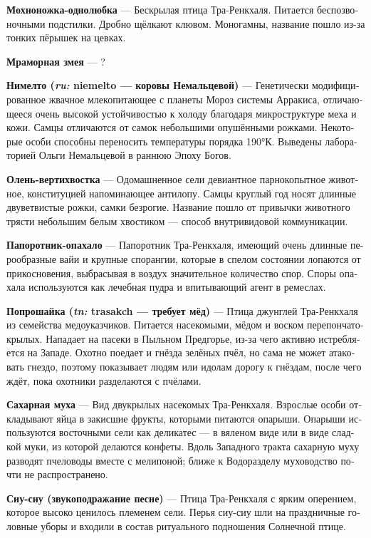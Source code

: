 \documentclass[a4paper,12pt,fleqn]{book}\usepackage{polyglossia}\setdefaultlanguage[babelshorthands=true]{russian}\setotherlanguage{english}\defaultfontfeatures{Ligatures=TeX,Mapping=tex-text}\usepackage{xcolor}\newcommand{\ml}[3]{#2}
\newcommand{\theterm}[3]{\textbf{\hypertarget{#1}{#2}} --- #3}
\newcommand{\theorigin}[3]{\textit{#1:} #2 --- #3}
\begin{document}
\theterm{one-love-furfeet}
{Мохноножка-однолюбка}
{Бескрылая птица Тра-Ренкхаля.
Питается беспозвоночными подстилки.
Дробно щёлкают клювом.
Моногамны, название пошло из-за тонких пёрышек на цевках.}

\theterm{marblesnake}
{Мраморная змея}
{?}

\theterm{niemelto}
{Нимелто (\theorigin{ru}{niemelto}{коровы Немальцевой})}
{Генетически модифицированное жвачное млекопитающее с планеты Мороз системы Арракиса, отличающееся очень высокой устойчивостью к холоду благодаря микроструктуре меха и кожи.
Самцы отличаются от самок небольшими опушёнными рожками. Некоторые особи способны переносить температуры порядка 190°К.
Выведены лабораторией Ольги Немальцевой в раннюю Эпоху Богов.}

\theterm{fiddletail-deer}
{Олень-вертихвостка}
{Одомашненное сели девиантное парнокопытное животное, конституцией напоминающее антилопу.
Самцы круглый год носят длинные двуветвистые рожки, самки безрогие.
Название пошло от привычки животного трясти небольшим белым хвостиком --- способ внутривидовой коммуникации.}

\theterm{swing-around}
{Папоротник-опахало}
{Папоротник Тра-Ренкхаля, имеющий очень длинные перообразные вайи и крупные спорангии, которые в спелом состоянии лопаются от прикосновения, выбрасывая в воздух значительное количество спор.
Споры опахала используются как лечебная пудра и впитывающий агент в ремеслах.}

\theterm{beggarbird}
{Попрошайка (\theorigin{tn}{trasakch}{требует мёд})}
{Птица джунглей Тра-Ренкхаля из семейства медоуказчиков.
Питается насекомыми, мёдом и воском перепончатокрылых.
Нападает на пасеки в Пыльном Предгорье, из-за чего активно истребляется на Западе.
Охотно поедает и гнёзда зелёных пчёл, но сама не может атаковать гнездо, поэтому показывает людям или идолам дорогу к гнёздам, после чего ждёт, пока охотники разделаются с пчёлами.}

\theterm{sugarfly}
{Сахарная муха}
{Вид двукрылых насекомых Тра-Ренкхаля.
Взрослые особи откладывают яйца в закисшие фрукты, которыми питаются опарыши.
Опарыши используются восточными сели как деликатес --- в вяленом виде или в виде сладкой муки, из которой делаются конфеты.
Вдоль Западного тракта сахарную муху разводят пчеловоды вместе с мелипоной;
ближе к Водоразделу муховодство почти не распространено.}

\theterm{siu-siu}
{Сиу-сиу (звукоподражание песне)}
{Птица Тра-Ренкхаля с ярким оперением, которое высоко ценилось племенем сели.
Перья сиу-сиу шли на праздничные головные уборы и входили в состав ритуального подношения Солнечной птице.}
\end{document}
